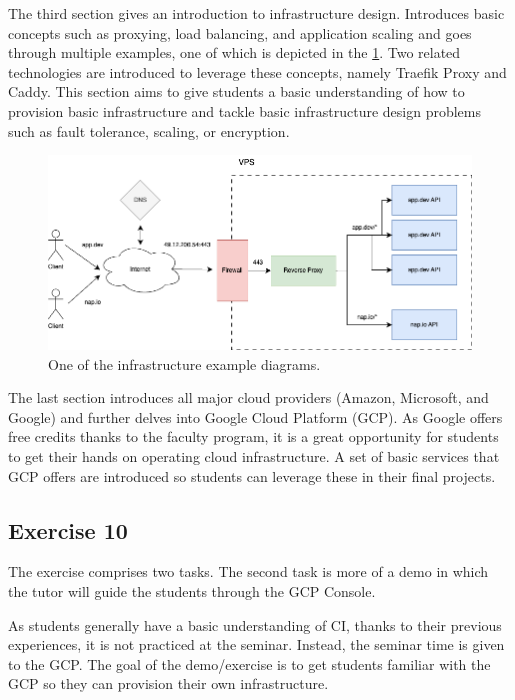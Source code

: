 \documentclass[
  digital,
  color,
  oneside,
  nosansbold,
  nocolorbold,
  nolof,
  nolot,
]{fithesis4}
\begin{document}
The third section gives an introduction to infrastructure design. Introduces basic concepts such as proxying, load balancing, and application scaling and goes through multiple examples, one of which is depicted in the \cref{fig:infra}. Two related technologies are introduced to leverage these concepts, namely Traefik Proxy\cite{traefik} and Caddy\cite{caddy}. This section aims to give students a basic understanding of how to provision basic infrastructure and tackle basic infrastructure design problems such as fault tolerance, scaling, or encryption.

\begin{figure}[H]
    \centering
    \includegraphics[width=12cm]{figures/infrastructure.png}
    \caption{One of the infrastructure example diagrams.}
    \label{fig:infra}
\end{figure}

The last section introduces all major cloud providers (Amazon, Microsoft, and Google) and further delves into Google Cloud Platform (GCP)\cite{gcp}. As Google offers free credits thanks to the faculty program\cite{gcp-faculty}, it is a great opportunity for students to get their hands on operating cloud infrastructure. A set of basic services that GCP offers are introduced so students can leverage these in their final projects.

\subsection{Exercise 10}\label{exercise-10}

The exercise comprises two tasks. The second task is more of a demo in which the tutor will guide the students through the GCP Console.

As students generally have a basic understanding of CI, thanks to their previous experiences, it is not practiced at the seminar. Instead, the seminar time is given to the GCP. The goal of the demo/exercise is to get students familiar with the GCP so they can provision their own infrastructure. \\
\end{document}
